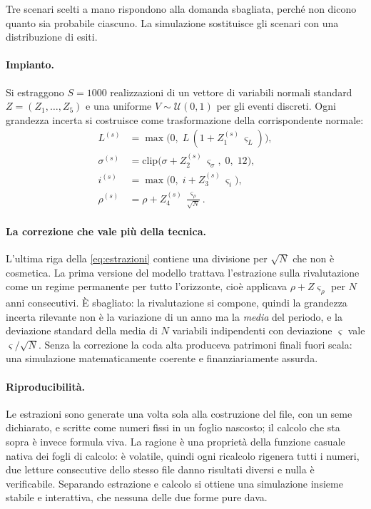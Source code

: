 \documentclass[11pt,a4paper]{article}
\theoremstyle{definition}
\theoremstyle{plain}
\begin{document}
Tre scenari scelti a mano rispondono alla domanda sbagliata, perché non dicono quanto sia probabile ciascuno. La simulazione sostituisce gli scenari con una distribuzione di esiti.

\paragraph{Impianto.} Si estraggono $S=1000$ realizzazioni di un vettore di variabili normali standard $Z = (Z_1,\dots,Z_5)$ e una uniforme $V\sim \mathcal{U}(0,1)$ per gli eventi discreti. Ogni grandezza incerta si costruisce come trasformazione della corrispondente normale:
\begin{align}
L^{(s)} &= \max\big(0,\; L\,(1+Z_1^{(s)}\,\varsigma_L)\big),\\
\sigma^{(s)} &= \mathrm{clip}\big(\sigma + Z_2^{(s)}\,\varsigma_\sigma,\; 0,\; 12\big),\\
i^{(s)} &= \max\big(0,\; i + Z_3^{(s)}\,\varsigma_i\big),\\
\rho^{(s)} &= \rho + Z_4^{(s)}\,\frac{\varsigma_\rho}{\sqrt{N}} .
\label{eq:estrazioni}
\end{align}

\paragraph{La correzione che vale più della tecnica.} L'ultima riga della \eqref{eq:estrazioni} contiene una divisione per $\sqrt{N}$ che non è cosmetica. La prima versione del modello trattava l'estrazione sulla rivalutazione come un regime permanente per tutto l'orizzonte, cioè applicava $\rho + Z\varsigma_\rho$ per $N$ anni consecutivi. È sbagliato: la rivalutazione si compone, quindi la grandezza incerta rilevante non è la variazione di un anno ma la \emph{media} del periodo, e la deviazione standard della media di $N$ variabili indipendenti con deviazione $\varsigma$ vale $\varsigma/\sqrt{N}$. Senza la correzione la coda alta produceva patrimoni finali fuori scala: una simulazione matematicamente coerente e finanziariamente assurda.

\paragraph{Riproducibilità.} Le estrazioni sono generate una volta sola alla costruzione del file, con un seme dichiarato, e scritte come numeri fissi in un foglio nascosto; il calcolo che sta sopra è invece formula viva. La ragione è una proprietà della funzione casuale nativa dei fogli di calcolo: è volatile, quindi ogni ricalcolo rigenera tutti i numeri, due letture consecutive dello stesso file danno risultati diversi e nulla è verificabile. Separando estrazione e calcolo si ottiene una simulazione insieme stabile e interattiva, che nessuna delle due forme pure dava.
\end{document}
